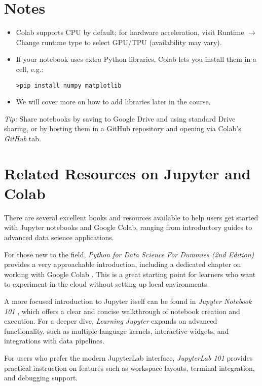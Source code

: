 \documentclass[11pt]{article}
\begin{document}
\section{Notes}
\begin{itemize}[leftmargin=*]
  \item Colab supports CPU by default; for hardware acceleration,
    visit Runtime $\rightarrow$ Change runtime type to select GPU/TPU
    (availability may vary).    
  \item If your notebook uses extra Python libraries, Colab lets you
    install them in a cell, e.g.:   
\begin{lstlisting}[style=cmd]
>pip install numpy matplotlib
\end{lstlisting}
  \item We will cover more on how to add libraries later in the course.
\end{itemize}

\bigskip
\noindent\textit{Tip:} Share notebooks by saving to Google Drive and using standard Drive sharing, or by hosting them in a GitHub repository and opening via Colab's \emph{GitHub} tab.

\section{Related Resources on Jupyter and Colab}

There are several excellent books and resources available to help users get started with
Jupyter notebooks and Google Colab, ranging from introductory guides to advanced data science
applications.

For those new to the field, \emph{Python for Data Science For Dummies (2nd Edition)} 
provides a very approachable introduction, including a dedicated chapter on 
working with Google Colab \cite{muller2019python}. This is a great starting point 
for learners who want to experiment in the cloud without setting up local environments.

A more focused introduction to Jupyter itself can be found in 
\emph{Jupyter Notebook 101} \cite{driscoll2018jupyter}, which offers a clear 
and concise walkthrough of notebook creation and execution. For a deeper dive, 
\emph{Learning Jupyter} \cite{huff2016learning} expands on advanced functionality, 
such as multiple language kernels, interactive widgets, and integrations with 
data pipelines.

For users who prefer the modern JupyterLab interface, \emph{JupyterLab 101} 
\cite{driscoll2020jupyterlab} provides practical instruction on features such as 
workspace layouts, terminal integration, and debugging support.
\end{document}
